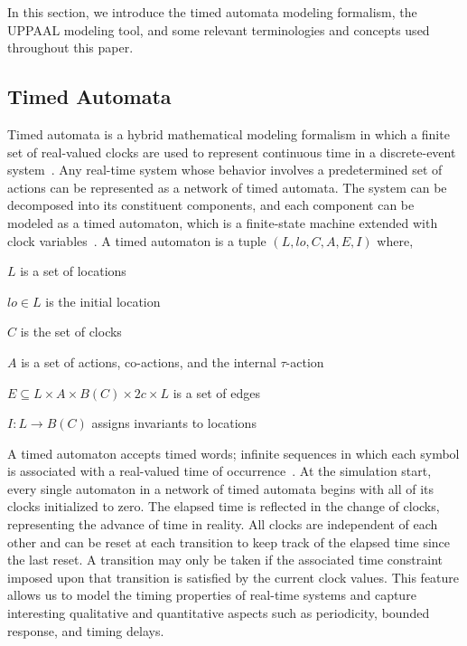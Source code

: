 In this section, we introduce the timed automata modeling formalism, the UPPAAL modeling tool, and some relevant terminologies and concepts used throughout this paper.

\subsection{Timed Automata}
\label{sub: timed_automata}
Timed automata is a hybrid mathematical modeling formalism in which a finite set of real-valued clocks are used to represent continuous time in a discrete-event system~\cite{alur1994_Theory_Timed_Automata}. Any real-time system whose behavior involves a predetermined set of actions can be represented as a network of timed automata. The system can be decomposed into its constituent components, and each component can be modeled as a timed automaton, which is a finite-state machine extended with clock variables~\cite{behrmann2004_Tutorial_UPPAAL}. A timed automaton is a tuple $(L, lo, C, A, E, I)$ where,
\par
$L$ is a set of locations
\par
$lo \in L$ is the initial location
\par
$C$ is the set of clocks 
\par
$A$ is a set of actions, co-actions, and the internal $\tau$-action
\par
$E \subseteq L \times A \times B(C) \times 2c \times L$ is a set of edges
\par
$I : L \to B(C)$ assigns invariants to locations 
\par
A timed automaton accepts timed words; infinite sequences in which each symbol is associated with a real-valued time of occurrence~\cite{alur1994_Theory_Timed_Automata}. At the simulation start, every single automaton in a network of timed automata begins with all of its clocks initialized to zero. The elapsed time is reflected in the change of clocks, representing the advance of time in reality. All clocks are independent of each other and can be reset at each transition to keep track of the elapsed time since the last reset. A transition may only be taken if the associated time constraint imposed upon that transition is satisfied by the current clock values. This feature allows us to model the timing properties of real-time systems and capture interesting qualitative and quantitative aspects such as periodicity, bounded response, and timing delays.

